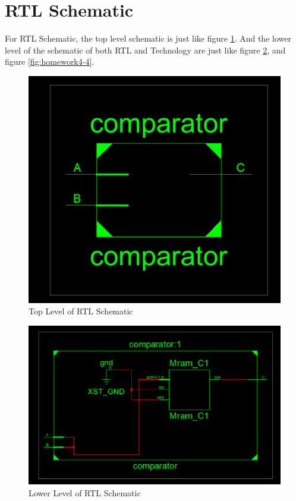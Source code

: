 \documentclass{article}
\begin{document}
    \section{RTL Schematic}
    \label{sec:rtlschematic}
    
    For RTL Schematic, the top level schematic is just like figure \ref{fig:homework4-2}.
    And the lower level of the schematic of both RTL and Technology are just like figure \ref{fig:homework4-3}, and figure \ref{fig:homework4-4}.
    
\begin{figure}[h!]
\centering
\includegraphics[width=1\linewidth]{homework4-2}
\caption{Top Level of RTL Schematic}
\label{fig:homework4-2}
\end{figure}

\begin{figure}[h!]
\centering
\includegraphics[width=1\linewidth]{homework4-3}
\caption{Lower Level of RTL Schematic}
\label{fig:homework4-3}
\end{figure}
\end{document}
